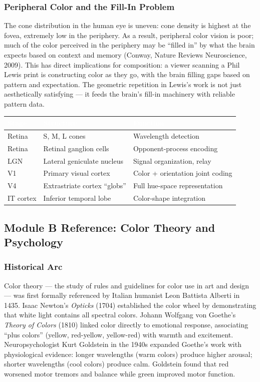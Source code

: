 \documentclass[11pt,letterpaper]{article}
\newcommand{\tableheader}[1]{\textbf{\sffamily\textcolor{white}{#1}}}
\begin{document}
\subsubsection{Peripheral Color and the Fill-In Problem}

The cone distribution in the human eye is uneven: cone density is highest at the fovea, extremely low in the periphery. As a result, peripheral color vision is poor; much of the color perceived in the periphery may be ``filled in'' by what the brain expects based on context and memory (Conway, Nature Reviews Neuroscience, 2009). This has direct implications for composition: a viewer scanning a Phil Lewis print is constructing color as they go, with the brain filling gaps based on pattern and expectation. The geometric repetition in Lewis's work is not just aesthetically satisfying --- it feeds the brain's fill-in machinery with reliable pattern data.

\begin{center}
\begin{tabularx}{\textwidth}{L{3cm}L{4cm}X}
\toprule
{}
\tableheader{Stage} & \tableheader{Structure} & \tableheader{Function} \\
\midrule
Retina & S, M, L cones & Wavelength detection \\
Retina & Retinal ganglion cells & Opponent-process encoding \\
LGN & Lateral geniculate nucleus & Signal organization, relay \\
V1 & Primary visual cortex & Color + orientation joint coding \\
V4 & Extrastriate cortex ``globs'' & Full hue-space representation \\
IT cortex & Inferior temporal lobe & Color-shape integration \\
\bottomrule
\end{tabularx}
\end{center}

\subsection{Module B Reference: Color Theory and Psychology}

\subsubsection{Historical Arc}

Color theory --- the study of rules and guidelines for color use in art and design --- was first formally referenced by Italian humanist Leon Battista Alberti in 1435. Isaac Newton's \textit{Opticks} (1704) established the color wheel by demonstrating that white light contains all spectral colors. Johann Wolfgang von Goethe's \textit{Theory of Colors} (1810) linked color directly to emotional response, associating ``plus colors'' (yellow, red-yellow, yellow-red) with warmth and excitement. Neuropsychologist Kurt Goldstein in the 1940s expanded Goethe's work with physiological evidence: longer wavelengths (warm colors) produce higher arousal; shorter wavelengths (cool colors) produce calm. Goldstein found that red worsened motor tremors and balance while green improved motor function.
\end{document}
